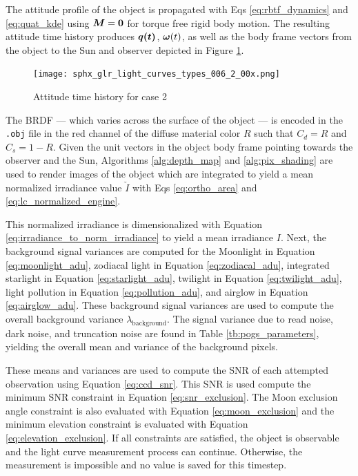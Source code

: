 The attitude profile of the object is propagated with Eqs \ref{eq:rbtf_dynamics} and \ref{eq:quat_kde} using $\bm{M}=\mathbf{0}$ for torque free rigid body motion. The resulting attitude time history produces $\bm{\bm{q}(t)}$, $\bm{\omega}(t)$, as well as the body frame vectors from the object to the Sun and observer depicted in Figure \ref{fig:case2_attitude}.

\begin{figure}[!htb]
  \centering
  \texttt{[image: sphx\_glr\_light\_curves\_types\_006\_2\_00x.png]}
  \caption{Attitude time history for case 2}
  \label{fig:case2_attitude}
\end{figure}

The BRDF --- which varies across the surface of the object --- is encoded in the \texttt{.obj} file in the red channel of the diffuse material color $R$ such that $C_d = R$ and $C_s = 1 - R$. Given the unit vectors in the object body frame pointing towards the observer and the Sun, Algorithms \ref{alg:depth_map} and \ref{alg:pix_shading} are used to render images of the object which are integrated to yield a mean normalized irradiance value $\check{I}$ with Eqs \ref{eq:ortho_area} and \ref{eq:lc_normalized_engine}. 

This normalized irradiance is dimensionalized with Equation \ref{eq:irradiance_to_norm_irradiance} to yield a mean irradiance $I$. Next, the background signal variances are computed for the Moonlight in Equation \ref{eq:moonlight_adu}, zodiacal light in Equation \ref{eq:zodiacal_adu}, integrated starlight in Equation \ref{eq:starlight_adu}, twilight in Equation \ref{eq:twilight_adu}, light pollution in Equation \ref{eq:pollution_adu}, and airglow in Equation \ref{eq:airglow_adu}. These background signal variances are used to compute the overall background variance $\lambda_\mathrm{background}$. The signal variance due to read noise, dark noise, and truncation noise are found in Table \ref{tb:pogs_parameters}, yielding the overall mean and variance of the background pixels. 

These means and variances are used to compute the SNR of each attempted observation using Equation \ref{eq:ccd_snr}. This SNR is used compute the minimum SNR constraint in Equation \ref{eq:snr_exclusion}. The Moon exclusion angle constraint is also evaluated with Equation \ref{eq:moon_exclusion} and the minimum elevation constraint is evaluated with Equation \ref{eq:elevation_exclusion}. If all constraints are satisfied, the object is observable and the light curve measurement process can continue. Otherwise, the measurement is impossible and no value is saved for this timestep.

